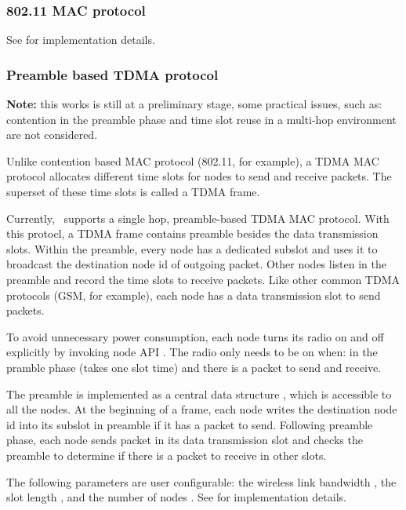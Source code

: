 \subsubsection{802.11 MAC protocol}
\label{sec:802_11}

See  for implementation details.

\subsubsection{Preamble based TDMA protocol}
\label{sec:tdma}
{\bf Note:} this works is still at a preliminary stage,
  some practical issues, such as:
  contention in the preamble phase and 
  time slot reuse in a multi-hop environment are not considered.

Unlike contention based MAC protocol (802.11, for example), 
  a TDMA MAC protocol allocates different time slots for nodes to 
  send and receive packets.
The superset of these time slots is called a TDMA frame.

Currently, \ns\ supports a single hop, 
  preamble-based TDMA MAC protocol.
With this protocl,
  a TDMA frame contains preamble besides the data transmission slots.
Within the preamble,
  every node has a dedicated subslot and
  uses it to broadcast the destination node id of outgoing packet.
Other nodes listen in the preamble and record 
  the time slots to receive packets.
Like other common TDMA protocols (GSM, for example),
  each node has a data transmission slot to send packets.

To avoid unnecessary power consumption,
  each node turns its radio on and off explicitly
  by invoking node API .
The radio only needs to be on when:
  in the pramble phase (takes one slot time) and
  there is a packet to send and receive.

The preamble is implemented as a central data structure
  ,
  which is accessible to all the nodes.
At the beginning of a frame,
  each node writes the destination node id into
  its subslot in preamble if it has a packet to send.
Following preamble phase,
  each node sends packet in its data transmission slot and
  checks the preamble to determine if 
  there is a packet to receive in other slots.

The following parameters are user configurable:
 the wireless link bandwidth ,  
  the slot length , 
  and the number of nodes .
See  for implementation details.

